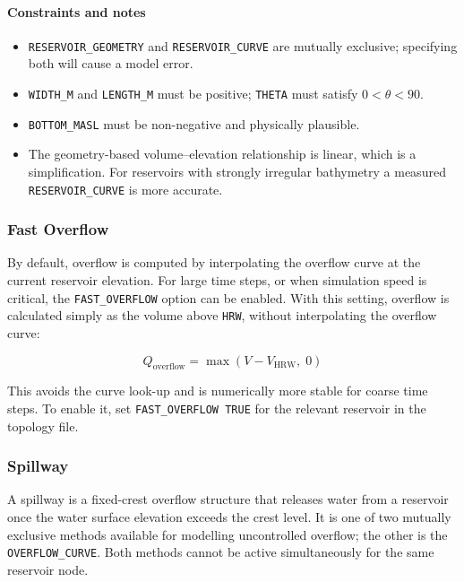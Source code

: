 \documentclass[a4paper, 12pt]{report}
\begin{document}
\paragraph{Constraints and notes}

\begin{itemize}
	\item \texttt{RESERVOIR\_GEOMETRY} and \texttt{RESERVOIR\_CURVE} are mutually exclusive; specifying both will cause a model error.
	\item \texttt{WIDTH\_M} and \texttt{LENGTH\_M} must be positive; \texttt{THETA} must satisfy $0 < \theta < 90$.
	\item \texttt{BOTTOM\_MASL} must be non-negative and physically plausible.
	\item The geometry-based volume--elevation relationship is linear, which is a simplification. For reservoirs with strongly irregular bathymetry a measured \texttt{RESERVOIR\_CURVE} is more accurate.
\end{itemize}




	\subsubsection{Fast Overflow}
	\label{subsubsec:fast_overflow}

	By default, overflow is computed by interpolating the overflow curve at the current reservoir
	elevation. For large time steps, or when simulation speed is critical, the \texttt{FAST\_OVERFLOW}
	option can be enabled. With this setting, overflow is calculated simply as the volume above
	\texttt{HRW}, without interpolating the overflow curve:

	$$Q_\mathrm{overflow} = \max\!\left(V - V_\mathrm{HRW},\; 0\right)$$

	This avoids the curve look-up and is numerically more stable for coarse time steps. To enable
	it, set \texttt{FAST\_OVERFLOW TRUE} for the relevant reservoir in the topology file.




	\subsubsection{Spillway}

	A spillway is a fixed-crest overflow structure that releases water from a reservoir once the water surface elevation exceeds the crest level. It is one of two mutually exclusive methods available for modelling uncontrolled overflow; the other is the \texttt{OVERFLOW\_CURVE}. Both methods cannot be active simultaneously for the same reservoir node.
\end{document}
